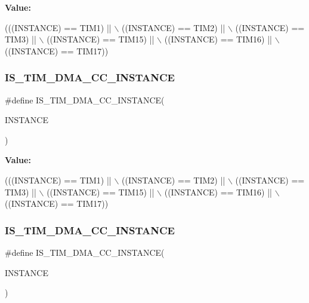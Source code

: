 {\bfseries Value\+:}
\begin{DoxyCode}
(((INSTANCE) == TIM1)    || \(\backslash\)
   ((INSTANCE) == TIM2)    || \(\backslash\)
   ((INSTANCE) == TIM3)    || \(\backslash\)
   ((INSTANCE) == TIM15)   || \(\backslash\)
   ((INSTANCE) == TIM16)   || \(\backslash\)
   ((INSTANCE) == TIM17))
\end{DoxyCode}
\mbox{\label{group___exported__macro_gad80a186286ce3daa92249a8d52111aaf}} 
\subsubsection{\texorpdfstring{I\+S\+\_\+\+T\+I\+M\+\_\+\+D\+M\+A\+\_\+\+C\+C\+\_\+\+I\+N\+S\+T\+A\+N\+CE}{IS\_TIM\_DMA\_CC\_INSTANCE}\hspace{0.1cm}{\footnotesize\ttfamily [10/16]}}
{\footnotesize\ttfamily \#define I\+S\+\_\+\+T\+I\+M\+\_\+\+D\+M\+A\+\_\+\+C\+C\+\_\+\+I\+N\+S\+T\+A\+N\+CE(\begin{DoxyParamCaption}\item[{}]{I\+N\+S\+T\+A\+N\+CE }\end{DoxyParamCaption})}

{\bfseries Value\+:}
\begin{DoxyCode}
(((INSTANCE) == TIM1)    || \(\backslash\)
   ((INSTANCE) == TIM2)    || \(\backslash\)
   ((INSTANCE) == TIM3)    || \(\backslash\)
   ((INSTANCE) == TIM15)   || \(\backslash\)
   ((INSTANCE) == TIM16)   || \(\backslash\)
   ((INSTANCE) == TIM17))
\end{DoxyCode}
\mbox{\label{group___exported__macro_gad80a186286ce3daa92249a8d52111aaf}} 
\subsubsection{\texorpdfstring{I\+S\+\_\+\+T\+I\+M\+\_\+\+D\+M\+A\+\_\+\+C\+C\+\_\+\+I\+N\+S\+T\+A\+N\+CE}{IS\_TIM\_DMA\_CC\_INSTANCE}\hspace{0.1cm}{\footnotesize\ttfamily [11/16]}}
{\footnotesize\ttfamily \#define I\+S\+\_\+\+T\+I\+M\+\_\+\+D\+M\+A\+\_\+\+C\+C\+\_\+\+I\+N\+S\+T\+A\+N\+CE(\begin{DoxyParamCaption}\item[{}]{I\+N\+S\+T\+A\+N\+CE }\end{DoxyParamCaption})}

